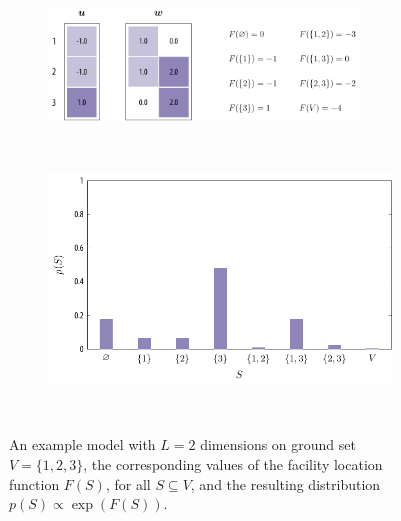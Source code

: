 \begin{example}[\flid{}]
\renewcommand{\subflen}{\textwidth}
\begin{figure}[htbp]
  \centering
  \begin{subfigure}[b]{\subflen}
    \centering
    \includegraphics[width=0.9\textwidth]{figures/background/flid.pdf}
  \end{subfigure}\\[1.5em]
  \begin{subfigure}[b]{\subflen}
    \centering
    \hspace{-2.65em}\includegraphics[width=1.07\textwidth]{figures/background/flid_dist.pdf}
  \end{subfigure}\\[1em]
  \caption{An example \flid{} model with $L = 2$ dimensions on ground set $V = \{1, 2, 3\}$, the corresponding values of the facility location function $F(S)$, for all $S \subseteq V$, and the resulting distribution $p(S) \propto \exp(F(S))$.}
  \label{fig:flid}
\end{figure}
\end{example}

